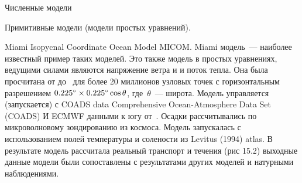 \begin{chapter}{Численные модели}
\begin{section}{Примитивные модели (модели простых уравнений).}
\begin{paragraph}{Miami Isopycnal Coordinate Ocean Model MICOM.}
Miami модель~--- наиболее известный пример таких моделей. Это также
модель в простых уравнениях, ведущими силами являются напряжение ветра
и и поток тепла. Она была просчитана от 
до~ для более 20 миллионов узловых точек с
горизонтальным разрешением ${0.225}^\circ\times
{0.225}^\circ\cos\theta$, где~$\theta$~--- широта. Модель
управляется (запускается) с COADS data Comprehensive Ocean-Atmosphere
Data Set (COADS) И ECMWF данными к югу от~. Осадки рассчитывались
по микроволновому зондированию из космоса. Модель запускалась с
использованием полей температуры и солености из Levitus (1994)
atlas. В результате модель рассчитала реальный транспорт и течения
(рис 15.2) выходные данные модели были сопоставлены с результатами
других моделей и натурными наблюдениями.
%
\end{paragraph}




\end{section}
\end{chapter}
